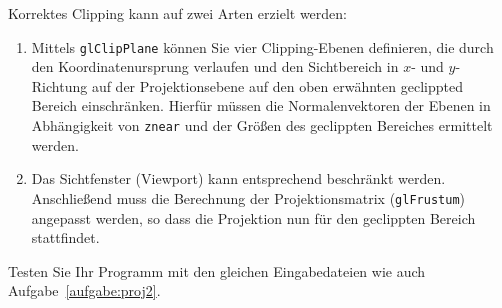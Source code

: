 Korrektes Clipping kann auf zwei Arten erzielt werden:
\begin{enumerate}
\item Mittels \texttt{glClipPlane} können Sie vier Clipping-Ebenen 
      definieren, die durch den Koordinatenursprung verlaufen und den 
      Sichtbereich in $x$- und $y$-Richtung auf der Projektionsebene auf 
      den oben erwähnten geclippted Bereich einschränken. Hierfür müssen 
      die Normalenvektoren der Ebenen in Abhängigkeit von \texttt{znear} 
      und der Größen des geclippten Bereiches ermittelt werden.
\item Das Sichtfenster (Viewport) kann entsprechend beschränkt werden. 
      Anschließend muss die Berechnung der Projektionsmatrix 
      (\texttt{glFrustum}) angepasst werden, so dass die Projektion nun 
      für den geclippten Bereich stattfindet.
\end{enumerate}

Testen Sie Ihr Programm mit den gleichen Eingabedateien wie auch 
Aufgabe~\ref{aufgabe:proj2}.
